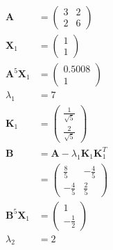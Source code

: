 \documentclass{article}
\begin{document}
\setcounter{subsubsection}{6}
\subsubsection{}

\begin{align*}
  \mathbf{A}                & = \begin{pmatrix}
                                  3 & 2 \\
                                  2 & 6
                                \end{pmatrix}                                     \\
  \mathbf{X}_1              & = \begin{pmatrix}
                                  1 \\
                                  1
                                \end{pmatrix}                                     \\
  \mathbf{A}^5 \mathbf{X}_1 & = \begin{pmatrix}
                                  0.5008 \\
                                  1
                                \end{pmatrix}                                     \\
  \lambda_1                 & = 7                                                  \\
  \mathbf{K}_1              & = \begin{pmatrix}
                                  \frac{1}{\sqrt{5}} \\
                                  \frac{2}{\sqrt{5}}
                                \end{pmatrix}                  \\
  \mathbf{B}                & = \mathbf{A} - \lambda_1 \mathbf{K}_1 \mathbf{K}_1^T \\
                            & = \begin{pmatrix}
                                  \frac{8}{5}  & -\frac{4}{5} \\
                                  -\frac{4}{5} & \frac{2}{5}
                                \end{pmatrix}                        \\
  \mathbf{B}^5 \mathbf{X}_1 & = \begin{pmatrix}
                                  1 \\
                                  -\frac{1}{2}
                                \end{pmatrix}                                     \\
  \lambda_2                 & = 2
\end{align*}
\end{document}
